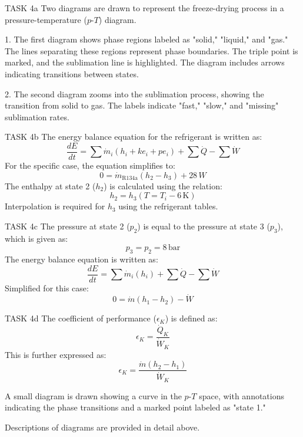 TASK 4a  
Two diagrams are drawn to represent the freeze-drying process in a pressure-temperature (\(p\)-\(T\)) diagram.  

1. The first diagram shows phase regions labeled as "solid," "liquid," and "gas." The lines separating these regions represent phase boundaries. The triple point is marked, and the sublimation line is highlighted. The diagram includes arrows indicating transitions between states.  

2. The second diagram zooms into the sublimation process, showing the transition from solid to gas. The labels indicate "fast," "slow," and "missing" sublimation rates.  

TASK 4b  
The energy balance equation for the refrigerant is written as:  
\[
\frac{dE}{dt} = \sum \dot{m}_i (h_i + ke_i + pe_i) + \sum \dot{Q} - \sum \dot{W}
\]  
For the specific case, the equation simplifies to:  
\[
0 = \dot{m}_{\text{R134a}} (h_2 - h_3) + 28 \, W
\]  
The enthalpy at state 2 (\(h_2\)) is calculated using the relation:  
\[
h_2 = h_3 (T = T_i - 6 \, \text{K})
\]  
Interpolation is required for \(h_3\) using the refrigerant tables.  

TASK 4c  
The pressure at state 2 (\(p_2\)) is equal to the pressure at state 3 (\(p_3\)), which is given as:  
\[
p_3 = p_2 = 8 \, \text{bar}
\]  
The energy balance equation is written as:  
\[
\frac{dE}{dt} = \sum \dot{m}_i (h_i) + \sum \dot{Q} - \sum \dot{W}
\]  
Simplified for this case:  
\[
0 = \dot{m} (h_1 - h_2) - \dot{W}
\]  

TASK 4d  
The coefficient of performance (\(\epsilon_K\)) is defined as:  
\[
\epsilon_K = \frac{\dot{Q}_K}{\dot{W}_K}
\]  
This is further expressed as:  
\[
\epsilon_K = \frac{\dot{m} (h_2 - h_1)}{\dot{W}_K}
\]  

A small diagram is drawn showing a curve in the \(p\)-\(T\) space, with annotations indicating the phase transitions and a marked point labeled as "state 1."  

Descriptions of diagrams are provided in detail above.